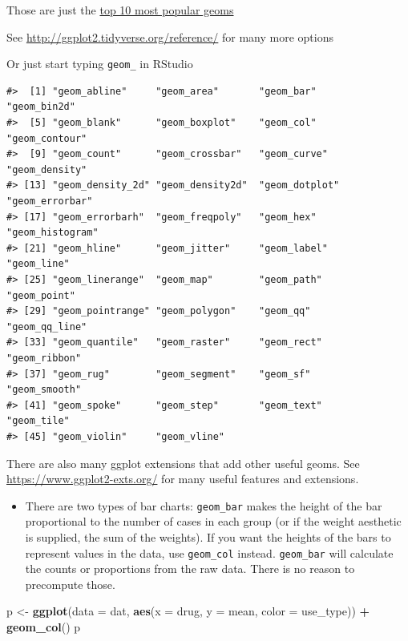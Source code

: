 \documentclass[]{book}
\newenvironment{Shaded}{\begin{snugshade}}{\end{snugshade}}
\newcommand{\DataTypeTok}[1]{\textcolor[rgb]{0.13,0.29,0.53}{#1}}
\newcommand{\KeywordTok}[1]{\textcolor[rgb]{0.13,0.29,0.53}{\textbf{#1}}}
\newcommand{\NormalTok}[1]{#1}
\newcommand{\OperatorTok}[1]{\textcolor[rgb]{0.81,0.36,0.00}{\textbf{#1}}}
\newcommand{\StringTok}[1]{\textcolor[rgb]{0.31,0.60,0.02}{#1}}
\newenvironment{rmdblock}[1]
  {\begin{shaded*}
  \begin{itemize}
  \renewcommand{\labelitemi}{
    \raisebox{-.7\height}[0pt][0pt]{
      {\setkeys{Gin}{width=3em,keepaspectratio}\texttt{[image: images/\#1]}}
    }
  }
  \item
  }
  {
  \end{itemize}
  \end{shaded*}
  }
\newenvironment{rmdnote}
  {\begin{rmdblock}{note}}
  {\end{rmdblock}}
\theoremstyle{definition}
\theoremstyle{definition}
\theoremstyle{definition}
\theoremstyle{remark}
\begin{document}
Those are just the
\href{https://eric.netlify.com/2017/08/10/most-popular-ggplot2-geoms/}{top
10 most popular geoms}

See \url{http://ggplot2.tidyverse.org/reference/} for many more options

Or just start typing \texttt{geom\_} in RStudio

\begin{verbatim}
#>  [1] "geom_abline"     "geom_area"       "geom_bar"        "geom_bin2d"     
#>  [5] "geom_blank"      "geom_boxplot"    "geom_col"        "geom_contour"   
#>  [9] "geom_count"      "geom_crossbar"   "geom_curve"      "geom_density"   
#> [13] "geom_density_2d" "geom_density2d"  "geom_dotplot"    "geom_errorbar"  
#> [17] "geom_errorbarh"  "geom_freqpoly"   "geom_hex"        "geom_histogram" 
#> [21] "geom_hline"      "geom_jitter"     "geom_label"      "geom_line"      
#> [25] "geom_linerange"  "geom_map"        "geom_path"       "geom_point"     
#> [29] "geom_pointrange" "geom_polygon"    "geom_qq"         "geom_qq_line"   
#> [33] "geom_quantile"   "geom_raster"     "geom_rect"       "geom_ribbon"    
#> [37] "geom_rug"        "geom_segment"    "geom_sf"         "geom_smooth"    
#> [41] "geom_spoke"      "geom_step"       "geom_text"       "geom_tile"      
#> [45] "geom_violin"     "geom_vline"
\end{verbatim}

There are also many ggplot extensions that add other useful geoms. See
\url{https://www.ggplot2-exts.org/} for many useful features and
extensions.

\begin{rmdnote}
There are two types of bar charts: \texttt{geom\_bar} makes the height
of the bar proportional to the number of cases in each group (or if the
weight aesthetic is supplied, the sum of the weights). If you want the
heights of the bars to represent values in the data, use
\texttt{geom\_col} instead. \texttt{geom\_bar} will calculate the counts
or proportions from the raw data. There is no reason to precompute
those.
\end{rmdnote}

\begin{Shaded}
\begin{Highlighting}[]
\NormalTok{p <-}\StringTok{ }\KeywordTok{ggplot}\NormalTok{(}\DataTypeTok{data =}\NormalTok{ dat, }\KeywordTok{aes}\NormalTok{(}\DataTypeTok{x =}\NormalTok{ drug, }\DataTypeTok{y =}\NormalTok{ mean, }\DataTypeTok{color =}\NormalTok{ use_type)) }\OperatorTok{+}
\StringTok{  }\KeywordTok{geom_col}\NormalTok{()}
\NormalTok{p}
\end{Highlighting}
\end{Shaded}
\end{document}

